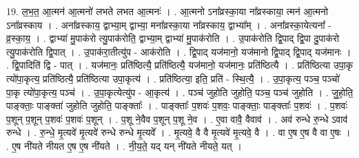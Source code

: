 \documentclass[17pt]{extarticle}
\begin{document}
19. ल॒भ॒त॒ आ॒त्मन॑ आ॒त्मनो॑ लभते लभत आ॒त्मनः॑ । . आ॒त्मनो ऽना᳚व्रस्का॒या ना᳚व्रस्काया॒ त्मन॑ आ॒त्मनो ऽना᳚व्रस्काय । . अना᳚व्रस्काय॒ द्वाभ्या॒म् द्वाभ्या॒ मना᳚व्रस्का॒या ना᳚व्रस्काय॒ द्वाभ्या᳚म् । . अना᳚व्रस्का॒येत्यना᳚ - व्र॒स्का॒य॒ । . द्वाभ्या॑ मु॒पाक॑रो त्यु॒पाक॑रोति॒ द्वाभ्या॒म् द्वाभ्या॑ मु॒पाक॑रोति । . उ॒पाक॑रोति द्वि॒पाद् द्वि॒पा दु॒पाक॑रो त्यु॒पाक॑रोति द्वि॒पात् । . उ॒पाक॑रा॒तीत्यु॑प - आक॑रोति । . द्वि॒पाद् यज॑मानो॒ यज॑मानो द्वि॒पाद् द्वि॒पाद् यज॑मानः । . द्वि॒पादिति॑ द्वि - पात् । . यज॑मानः॒ प्रति॑ष्ठित्यै॒ प्रति॑ष्ठित्यै॒ यज॑मानो॒ यज॑मानः॒ प्रति॑ष्ठित्यै । . प्रति॑ष्ठित्या उपा॒कृ त्यो॑पा॒कृत्य॒ प्रति॑ष्ठित्यै॒ प्रति॑ष्ठित्या उपा॒कृत्य॑ । . प्रति॑ष्ठित्या॒ इति॒ प्रति॑ - स्थि॒त्यै॒ । . उ॒पा॒कृत्य॒ पञ्च॒ पञ्चो॑ पा॒कृ त्यो॑पा॒कृत्य॒ पञ्च॑ । . उ॒पा॒कृत्येत्यु॑प - आ॒कृत्य॑ । . पञ्च॑ जुहोति जुहोति॒ पञ्च॒ पञ्च॑ जुहोति । . जु॒हो॒ति॒ पाङ्क्ताः॒ पाङ्क्ता॑ जुहोति जुहोति॒ पाङ्क्ताः᳚ । . पाङ्क्ताः᳚ प॒शवः॑ प॒शवः॒ पाङ्क्ताः॒ पाङ्क्ताः᳚ प॒शवः॑ । . प॒शवः॑ प॒शून् प॒शून् प॒शवः॑ प॒शवः॑ प॒शून् । . प॒शू ने॒वैव प॒शून् प॒शू ने॒व । . ए॒वा वावै॒ वैवाव॑ । . अव॑ रुन्धे रु॒न्धे ऽवाव॑ रुन्धे । . रु॒न्धे॒ मृ॒त्यवे॑ मृ॒त्यवे॑ रुन्धे रुन्धे मृ॒त्यवे᳚ । . मृ॒त्यवे॒ वै वै मृ॒त्यवे॑ मृ॒त्यवे॒ वै । . वा ए॒ष ए॒ष वै वा ए॒षः । . ए॒ष नी॑यते नीयत ए॒ष ए॒ष नी॑यते । . नी॒य॒ते॒ यद् यन् नी॑यते नीयते॒ यत् । \newline
\end{document}
